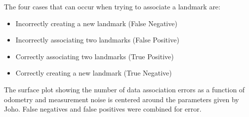 \documentclass[12pt]{article}
\begin{document}
The four cases that can occur when trying to associate a landmark are:
\begin{itemize}
\item Incorrectly creating a new landmark (False Negative)
\item Incorrectly associating two landmarks (False Positive)
\item Correctly associating two landmarks (True Positive)
\item Correctly creating a new landmark (True Negative)
\end{itemize}

The surface plot showing the number of data association errors as a function of odometry and measurement noise is centered around the parameters given by Joho.  False negatives and false positives were combined for error.
\end{document}
